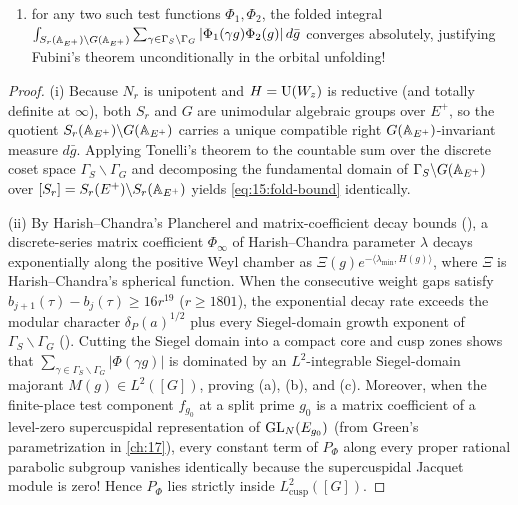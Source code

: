 \begin{proposition}
\begin{enumerate}[label=\textup{(\roman*)}]
\begin{enumerate}[label=\textup{(\alph*)}]
  \item for any two such test functions $\Phi_1, \Phi_2$, the folded integral $\int_{S_r(\mathbb{A}_{E^+}) \backslash G(\mathbb{A}_{E^+})} \sum_{\gamma \in \Gamma_S \backslash \Gamma_G} |\Phi_1(\gamma g)\Phi_2(g)|\, d\bar{g}$ converges absolutely, justifying Fubini's theorem unconditionally in the orbital unfolding!
  \end{enumerate}
\end{enumerate}
\end{proposition}

\begin{proof}
(i) Because $N_r$ is unipotent and $H = \mathrm{U}(W_z)$ is reductive (and totally definite at $\infty$), both $S_r$ and $G$ are unimodular algebraic groups over $E^+$, so the quotient $S_r(\mathbb{A}_{E^+}) \backslash G(\mathbb{A}_{E^+})$ carries a unique compatible right $G(\mathbb{A}_{E^+})$-invariant measure $d\bar{g}$. Applying Tonelli's theorem to the countable sum over the discrete coset space $\Gamma_S \backslash \Gamma_G$ and decomposing the fundamental domain of $\Gamma_S \backslash G(\mathbb{A}_{E^+})$ over $[S_r] = S_r(E^+) \backslash S_r(\mathbb{A}_{E^+})$ yields \eqref{eq:15:fold-bound} identically.

(ii) By Harish--Chandra's Plancherel and matrix-coefficient decay bounds (), a discrete-series matrix coefficient $\Phi_\infty$ of Harish--Chandra parameter $\lambda$ decays exponentially along the positive Weyl chamber as $\Xi(g) e^{-\langle \lambda_{\mathrm{min}}, H(g) \rangle}$, where $\Xi$ is Harish--Chandra's spherical function. When the consecutive weight gaps satisfy $b_{j+1}(\tau) - b_j(\tau) \ge 16 r^{19}$ ($r \ge 1801$), the exponential decay rate exceeds the modular character $\delta_P(a)^{1/2}$ plus every Siegel-domain growth exponent of $\Gamma_S \backslash \Gamma_G$ (). Cutting the Siegel domain into a compact core and cusp zones shows that $\sum_{\gamma \in \Gamma_S \backslash \Gamma_G} |\Phi(\gamma g)|$ is dominated by an $L^2$-integrable Siegel-domain majorant $M(g) \in L^2([G])$, proving (a), (b), and (c). Moreover, when the finite-place test component $f_{g_0}$ at a split prime $g_0$ is a matrix coefficient of a level-zero supercuspidal representation of $\mathrm{GL}_N(E_{g_0})$ (from Green's parametrization in \cref{ch:17}), every constant term of $P_\Phi$ along every proper rational parabolic subgroup vanishes identically because the supercuspidal Jacquet module is zero! Hence $P_\Phi$ lies strictly inside $L^2_{\mathrm{cusp}}([G])$.
\end{proof}

